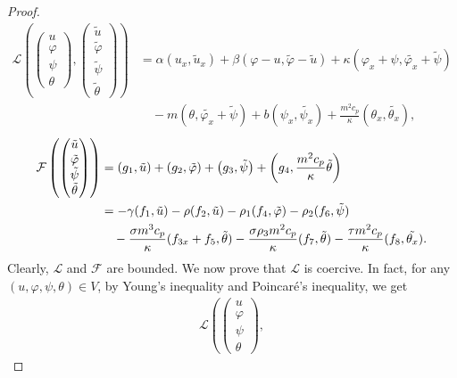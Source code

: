 \documentclass[10pt,a4paper]{amsart}
\begin{document}
\begin{proof}
\begin{equation}
		\begin{split}
			\mathcal{L}\left(
			\begin{pmatrix}u\\ \varphi \\ \psi \\ \theta\end{pmatrix},
			\begin{pmatrix}\tilde{u}\\ \tilde{\varphi} \\ \tilde{\psi} \\ \tilde{\theta}\end{pmatrix}
			\right) &= \alpha (u_x, \tilde{u}_x) + \beta (\varphi - u, \tilde{\varphi} - \tilde{u}) + \kappa (\varphi_x + \psi, \tilde{\varphi_x} + \tilde{\psi}) \\
			&\quad - m(\theta, \tilde{\varphi_x}+ \tilde{\psi}) + b (\psi_x, \tilde{\psi_x})   + \frac{m^2 c_p}{\kappa} (\theta_x, \tilde{\theta_x}),
		\end{split}
	\end{equation}
	\begin{align}\label{F}
		\mathcal{F}\left(
		\begin{pmatrix}\tilde{u}\\ \tilde{\varphi} \\ \tilde{\psi} \\ \tilde{\theta}\end{pmatrix}
		\right) &= \left(g_1, \tilde{u}\right) + \left(g_2, \tilde{\varphi}\right) + \left(g_3, \tilde{\psi}\right) + \left(g_4, \frac{m^2 c_p}{\kappa }\tilde{\theta}\right) \notag \\
		&=  - \gamma (f_1, \tilde{u}) - \rho (f_2, \tilde{u}) - \rho_1 (f_4, \tilde{\varphi}) - \rho_2 (f_6, \tilde{\psi})  \notag \\
		&\quad  - \frac{\sigma m^3 c_p }{\kappa } (f_{3x} + f_5, \tilde{\theta}) - \frac{\sigma \rho_3 m^2 c_p }{\kappa } (f_7, \tilde{\theta}) - \frac{\tau m^2 c_p}{\kappa}(f_8, \tilde{\theta_x}).
	\end{align}
	Clearly, $\mathcal{L}$ and $\mathcal{F}$ are bounded. We now prove that $\mathcal{L}$ is coercive. In fact, for any $(u, \varphi, \psi, \theta) \in V$, by Young's inequality and Poincar\'e's inequality, we get
	\begin{align*}\label{L-1}
		\mathcal{L}\left(
		\begin{pmatrix}u\\ \varphi \\ \psi \\ \theta\end{pmatrix},

\end{align*}
\end{proof}
\end{document}
